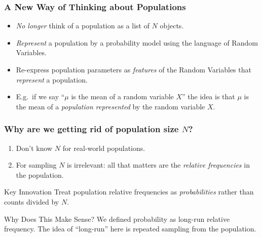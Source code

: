 \documentclass[handout]{beamer}
\begin{document}
%  
\begin{frame}
\frametitle{A New Way of Thinking about Populations}

\begin{itemize}
	\item \emph{No longer} think of a population as a list of $N$ objects.
	\item \emph{Represent} a population by a \alert{probability model} using the language of Random Variables.
	\item Re-express population parameters as \emph{features} of the Random Variables that \emph{represent} a population.
	\item E.g.\ if we say ``$\mu$ is the mean of a random variable $X$'' the idea is that $\mu$ is the mean of a \alert{\emph{population represented}} by the random variable $X$.
\end{itemize}


\end{frame}
\begin{frame}
\frametitle{Why are we getting rid of population size $N$?}

 
\begin{enumerate}
	\item Don't know $N$ for real-world populations. 
	\item For sampling $N$ is irrelevant: all that matters are the \alert{\emph{relative frequencies}} in the population. 
\end{enumerate}

\begin{block}{Key Innovation}
Treat population relative frequencies as \emph{probabilities} rather than counts divided by $N$.
\end{block}
 
\begin{block}{Why Does This Make Sense?}
We defined probability as long-run relative frequency. The idea of ``long-run'' here is repeated sampling from the population.
\end{block}

\end{frame}
\end{document}
